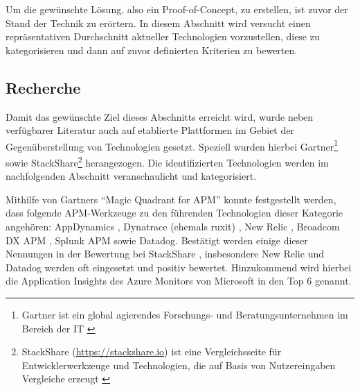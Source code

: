 
%
%

Um die gewünschte Lösung, also ein Proof-of-Concept, zu erstellen, ist zuvor der Stand der Technik zu erörtern. In diesem Abschnitt wird versucht einen repräsentativen Durchschnitt aktueller Technologien vorzustellen, diese zu kategorisieren und dann auf zuvor definierten Kriterien zu bewerten.

\subsection{Recherche}

Damit das gewünschte Ziel dieses Abschnitts erreicht wird, wurde neben verfügbarer Literatur auch auf etablierte Plattformen im Gebiet der Gegenüberstellung von Technologien gesetzt. Speziell wurden hierbei Gartner\footnote{Gartner ist ein global agierendes Forschungs- und Beratungsunternehmen im Bereich der IT \cite{GartnerDefinition}} sowie StackShare\footnote{StackShare (\url{https://stackshare.io}) ist eine Vergleichsseite für Entwicklerwerkzeuge und Technologien, die auf Basis von Nutzereingaben Vergleiche erzeugt \cite{StackshareDefinition}} herangezogen. Die identifizierten Technologien werden im nachfolgenden Abschnitt veranschaulicht und kategorisiert. 

Mithilfe von Gartners \enquote{Magic Quadrant for APM} \cite{GartnerMagicQuadrantForAPM} konnte festgestellt werden, dass folgende APM-Werkzeuge zu den führenden Technologien dieser Kategorie angehören: AppDynamics \cite{AppDynamics}, Dynatrace (ehemals ruxit) \cite{Dynatrace}, New Relic \cite{NewRelic}, Broadcom DX APM \cite{BroadcomDXAPM}, Splunk APM \cite{SplunkAPM} sowie Datadog\cite{Datadog}. Bestätigt werden einige dieser Nennungen in der Bewertung bei StackShare \cite{StackShareAPM}, insbesondere New Relic und Datadog werden oft eingesetzt und positiv bewertet. Hinzukommend wird hierbei die Application Insights \cite{AzureApplicationInsights} des Azure Monitors von Microsoft in den Top 6 genannt.

